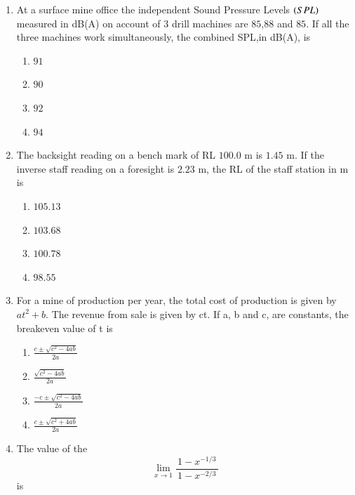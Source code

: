 \documentclass[journal,12pt,onecolumn]{IEEEtran}
\theoremstyle{remark}
\begin{document}
\begin{enumerate}
\hfill{}
\begin{multicols}{4}
\begin{enumerate}
\item triangular chocks
\item screw props 
\item safari supports
\item hydraulic props
\end{enumerate}
\end{multicols}
\item At a surface mine office the independent Sound Pressure Levels $\left(SPL\right)$ measured in dB(A) on account of $3$ drill machines are $85$,$88$ and $85$. If all the three machines work simultaneously, the combined SPL,in dB(A), is

\hfill{}
\begin{multicols}{4}
\begin{enumerate}
\item $91$
\item $90$ 
\item $92$
\item $94$
\end{enumerate}
\end{multicols}
\item The backsight reading on a bench mark of RL $100.0$ m is $1.45$ m. If the inverse staff reading on a foresight is $2.23$ m, the RL of the staff station in m is

\hfill{}
\begin{multicols}{4}
\begin{enumerate}
\item $105.13$
\item $103.68$ 
\item $100.78$
\item $98.55$
\end{enumerate}
\end{multicols}
\item For a mine of production per year, the total cost of production is given by $at^2 + b$. The revenue from sale is given by ct. If a, b and c, are constants, the breakeven value of t is

\hfill{}
  \begin{multicols}{2}
  \begin{enumerate}
    \item $\displaystyle \frac{c \pm \sqrt{c^2 - 4ab}}{2a}$
    \item $\displaystyle \frac{\sqrt{c^2 - 4ab}}{2a}$
    \item $\displaystyle \frac{-c \pm \sqrt{c^2 - 4ab}}{2a}$
    \item $\displaystyle \frac{c \pm \sqrt{c^2 + 4ab}}{2a}$
\end{enumerate}
  \end{multicols}
\item The value of the\[\lim_{x \to 1} \frac{\,1 - x^{-1/3}\,}{\,1 - x^{-2/3}\,}\] is


\end{enumerate}
\end{document}
